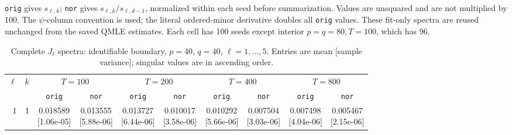 \documentclass[12pt,letterpaper]{article}
\def\spacingset#1{\renewcommand{\baselinestretch}{#1}\small\normalsize}
\theoremstyle{plain}
\theoremstyle{definition}
\begin{document}
\begin{table}[p]
\begin{adjustbox}{max width=\linewidth}
\begin{tabular}{@{}rr*{8}{c}@{}}
\bottomrule
\end{tabular}
\end{adjustbox}
\par\smallskip
\begin{minipage}{0.98\linewidth}\footnotesize
\texttt{orig} gives $s_{\ell,k}$; \texttt{nor} gives $s_{\ell,k}/s_{\ell,d-1}$, normalized within each seed before summarization. Values are unsquared and are not multiplied by 100. The $\psi$-column convention is used; the literal ordered-minor derivative doubles all \texttt{orig} values. These fit-only spectra are reused unchanged from the saved QMLE estimates. Each cell has 100 seeds except interior $p=q=80,T=100$, which has 96.
\end{minipage}
\endgroup
\end{table}
\clearpage
\begin{table}[p]
\begingroup
\spacingset{1.0}
\small\centering
\caption{Complete $J_\ell$ spectra: identifiable boundary, $p=40$, $q=40$, $\ell=1,\ldots,5$. Entries are mean [sample variance]; singular values are in ascending order.}
\label{s23:lambda:alltab:spectra:p40q40boundary:1-5}
\footnotesize
\setlength{\tabcolsep}{2.2pt}
\renewcommand{\arraystretch}{1.03}
\begin{adjustbox}{max width=\linewidth}
\begin{tabular}{@{}rr*{8}{c}@{}}
\toprule
$\ell$ & $k$ & \multicolumn{2}{c}{$T=100$} & \multicolumn{2}{c}{$T=200$} & \multicolumn{2}{c}{$T=400$} & \multicolumn{2}{c}{$T=800$}\\
\cmidrule(lr){3-4}\cmidrule(lr){5-6}\cmidrule(lr){7-8}\cmidrule(lr){9-10}
 &  & \texttt{orig} & \texttt{nor} & \texttt{orig} & \texttt{nor} & \texttt{orig} & \texttt{nor} & \texttt{orig} & \texttt{nor}\\
\midrule
1 & 1 & \shortstack{0.018589\\[-1pt]{\scriptsize[1.06e-05]}} & \shortstack{0.013555\\[-1pt]{\scriptsize[5.88e-06]}} & \shortstack{0.013727\\[-1pt]{\scriptsize[6.44e-06]}} & \shortstack{0.010017\\[-1pt]{\scriptsize[3.58e-06]}} & \shortstack{0.010292\\[-1pt]{\scriptsize[5.66e-06]}} & \shortstack{0.007504\\[-1pt]{\scriptsize[3.03e-06]}} & \shortstack{0.007498\\[-1pt]{\scriptsize[4.04e-06]}} & \shortstack{0.005467\\[-1pt]{\scriptsize[2.15e-06]}}\\

\end{tabular}
\end{adjustbox}
\end{table}
\end{document}
